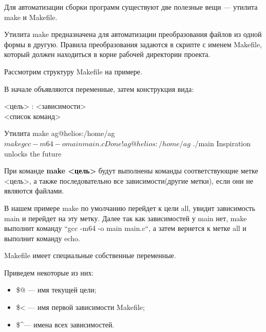 Для автоматизации сборки программ существуют две полезные вещи --- утилита make и Makefile.

Утилита make предназначена для автоматизации преобразования файлов из одной формы в другую. Правила преобразования задаются в скрипте с именем Makefile, который должен находиться в корне рабочей директории проекта.

Рассмотрим структуру Makefile на примере.


В начале объявляются переменные, затем конструкция вида:

<цель> : <зависимости> \\
<список команд>
			
\begin{shCode}{Утилита make}
	ag@helios:/home/ag $ make
	gcc -m64 -o main main.c
	Done!
	ag@helios:/home/ag $ ./main
	Inspiration unlocks the future \end{shCode}

При команде \textbf{make <цель>} будут выполнены команды соответствующие метке <цель>, а также последовательно все зависимости(другие метки), если они не являются файлами.

В нашем примере make по умолчанию перейдет к цели all, увидит зависимость main и перейдет на эту метку. Далее так как зависимостей у main нет, make выполнит команду “gcc -m64 -o main main.c“, а затем вернется к метке all и выполнит команду echo.

Makefile имеет специальные собственные переменные.

Приведем некоторые из них:

\begin{itemize}
	\item \$@  --- имя текущей цели;

	\item \$<  --- имя первой зависимости Makefile;

	\item \$\textasciicircum  --- имена всех зависимостей.
\end{itemize}
